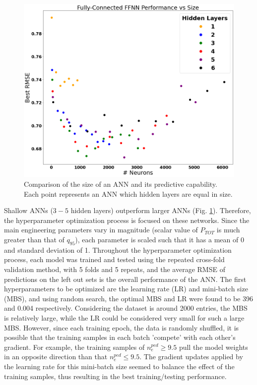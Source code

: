 \documentclass[a4paper, twoside, final, 12pt]{article}
\begin{document}
{\begin{figure}
	\centering
	\includegraphics[scale=0.2]{./src/ANN_performace_size}
	\caption{Comparison of the size of an ANN and its predictive capability. Each point represents an ANN which hidden layers are equal in size.}
	\label{fig:ANN_dim}
\end{figure}
Shallow ANNs ($3-5$ hidden layers) outperform larger ANNs (Fig. \ref{fig:ANN_dim}). Therefore, the hyperparameter optimization process is focused on these networks. Since the main engineering parameters vary in magnitude (scalar value of $P_{TOT}$ is much greater than that of $q_{95}$), each parameter is scaled such that it has a mean of 0 and standard deviation of 1. Throughout the hyperparameter optimization process, each model was trained and tested using the repeated cross-fold validation method, with 5 folds and 5 repeats, and the average RMSE of predictions on the left out sets is the overall performance of the ANN. The first hyperparameters to be optimized are the learning rate (LR) and mini-batch size (MBS), and using random search, the optimal MBS and LR were found to be 396 and 0.004 respectively. Considering the dataset is around 2000 entries, the MBS is relatively large, while the LR could be considered very small for such a large MBS. However, since each training epoch, the data is randomly shuffled, it is possible that the training samples in each batch 'compete' with each other's gradient. For example, the training samples of $n_e^{ped} \geq 9.5$ pull the model weights in an opposite direction than that $n_e^{ped} \leq 9.5$. The gradient updates applied by the learning rate for this mini-batch size seemed to balance the effect of the training samples, thus resulting in the best training/testing performance. 

}
\end{document}
